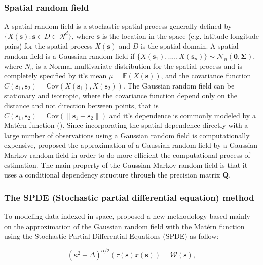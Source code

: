 \documentclass{article}
\begin{document}
\subsubsection{Spatial random field}
A spatial random field is a stochastic spatial process generally defined by $\{X(\boldsymbol{s}): \boldsymbol{s} \in D \subset \mathcal{R}^{d}\}$, where $\boldsymbol{s}$ is the location in the space (e.g. latitude-longitude pairs) for the spatial process $X(\boldsymbol{s})$ and $D$ is the spatial domain. A spatial random field is a Gaussian random field if $\{X(\boldsymbol{s}_{1}),...., X(\boldsymbol{s}_{n})\} \sim \mathcal{N}_{n}(\boldsymbol{0}, \boldsymbol{\Sigma})$, where $N_{n}$ is a Normal multivariate distribution for the spatial process and is completely specified by it's mean $\mu = \mathbb{E}(X(\boldsymbol{s}))$, and the covariance function $C(\boldsymbol{s}_{1}, \boldsymbol{s}_{2}) = \text{Cov}(X(\boldsymbol{s}_{1}), X(\boldsymbol{s}_{2}))$. The Gaussian random field can be stationary and isotropic, where the covariance function depend only on the distance and not direction between points, that is $C(\boldsymbol{s}_{1}, \boldsymbol{s}_{2}) = \text{Cov}(\|\boldsymbol{s}_{1} - \boldsymbol{s}_{2}\|)$ and it's dependence is commonly modeled by a Matérn function (\cite{stein2012interpolation}\cite{yuan2011models}). Since incorporating the spatial dependence directly with a large number of observations using a Gaussian random field is computationally expensive, \cite{rue2005gaussian} proposed the approximation of a Gaussian random field by a Gaussian Markov random field in order to do more efficient the computational process of estimation. The main property of the Gaussian Markov random field is that it uses a conditional dependency structure through the precision matrix $\boldsymbol{Q}$.


\subsubsection{The SPDE (Stochastic partial differential equation) method}

To modeling data indexed in space, \cite{lindgren2011explicit} proposed a new methodology based mainly on the approximation of the Gaussian random field with the Matérn function using the Stochastic Partial Differential Equations (SPDE) as follow:

\begin{equation}\label{eqn:eq1}
(\kappa^{2} - \Delta)^{\alpha/2}(\tau(\boldsymbol{s}) x(\boldsymbol{s})) = \boldsymbol{\mathcal{W}(s)},
\end{equation}
 
\end{document}
